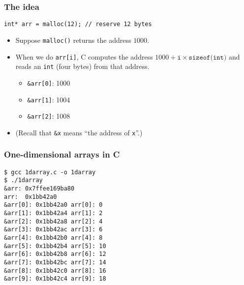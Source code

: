 \documentclass[rgb,dvipsnames,aspectratio=169,xcolor=table]{beamer}
\begin{document}
\begin{frame}
  \frametitle{The idea}

\begin{lstlisting}
int* arr = malloc(12); // reserve 12 bytes
\end{lstlisting}

  \begin{itemize}
  \item Suppose \texttt{malloc()} returns the address $1000$.
  \item When we do \texttt{arr[i]}, C computes the address
    $1000+\texttt{i}\times\texttt{sizeof(int)}$ and reads an
    \texttt{int} (four bytes) from that address.
    \begin{itemize}
    \item \lstinline{&arr[0]}: 1000
    \item \lstinline{&arr[1]}: 1004
    \item \lstinline{&arr[2]}: 1008
    \end{itemize}
  \item (Recall that \lstinline{&x} means ``the address of \texttt{x}''.)
  \end{itemize}

\end{frame}

\begin{frame}[fragile]
  \frametitle{One-dimensional arrays in C}

  \begin{minipage}{0.65\linewidth}
  
  \end{minipage}
  \hfill
  \begin{minipage}{0.3\linewidth}
    \scriptsize
\begin{verbatim}
$ gcc 1darray.c -o 1darray
$ ./1darray
&arr: 0x7ffee169ba80
arr:  0x1bb42a0
&arr[0]: 0x1bb42a0 arr[0]: 0
&arr[1]: 0x1bb42a4 arr[1]: 2
&arr[2]: 0x1bb42a8 arr[2]: 4
&arr[3]: 0x1bb42ac arr[3]: 6
&arr[4]: 0x1bb42b0 arr[4]: 8
&arr[5]: 0x1bb42b4 arr[5]: 10
&arr[6]: 0x1bb42b8 arr[6]: 12
&arr[7]: 0x1bb42bc arr[7]: 14
&arr[8]: 0x1bb42c0 arr[8]: 16
&arr[9]: 0x1bb42c4 arr[9]: 18
\end{verbatim}
  \end{minipage}

\end{frame}
\end{document}
